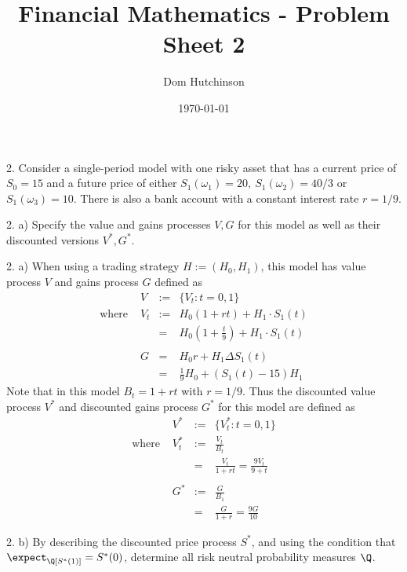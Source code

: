 \documentclass[11pt,a4paper]{article}
\begin{document}
\questionsfalse

\title{Financial Mathematics - Problem Sheet 2}
\author{Dom Hutchinson}
\date{\today}
\maketitle

\begin{question}{2.}
  Consider a single-period model with one risky asset that has a current price of $S_0=15$ and a future price of either $S_1(\omega_1)=20,\ S_1(\omega_2)=40/3$ or $S_1(\omega_3)=10$. There is also a bank account with a constant interest rate $r=1/9$.
\end{question}

\begin{question}{2. a)}
  Specify the value and gains processes $V,G$ for this model as well as their discounted versions $V^*,G^*$.
\end{question}

\begin{answer}{2. a)}
  When using a trading strategy $H:=(H_0,H_1)$, this model has value process $V$ and gains process $G$ defined as
  \[\begin{array}{rrrl}
    &V&:=&\{V_t:t=0,1\}\\
    \text{where }&V_t&:=&H_0(1+rt)+H_1\cdot S_1(t)\\
    &&=&H_0\left(1+\frac{t}9\right)+H_1\cdot S_1(t)\\
    \\
    &G&=&H_0r+H_1\Delta S_1(t)\\
    &&=&\frac19H_0+(S_1(t)-15)H_1
  \end{array}\]
  Note that in this model $B_t=1+rt$ with $r=1/9$. Thus the discounted value process $V^*$ and discounted gains process $G^*$ for this model are defined as
  \[\begin{array}{rrcl}
    &V^*&:=&\{V_t^*:t=0,1\}\\
    \text{where }&V_t^*&:=&\frac{V_t}{B_t}\\
    &&=&\frac{V_t}{1+rt}=\frac{9V_t}{9+t}\\
    \\
    &G^*&:=&\frac{G}{B_1}\\
    &&=&\frac{G}{1+r}=\frac{9G}{10}
  \end{array}\]
\end{answer}

\begin{question}{2. b)}
  By describing the discounted price process $S^*$, and using the condition that $\expect_\Q[S^*(1)]=S^*(0)$, determine all risk neutral probability measures $\Q$.
\end{question}
\end{document}
